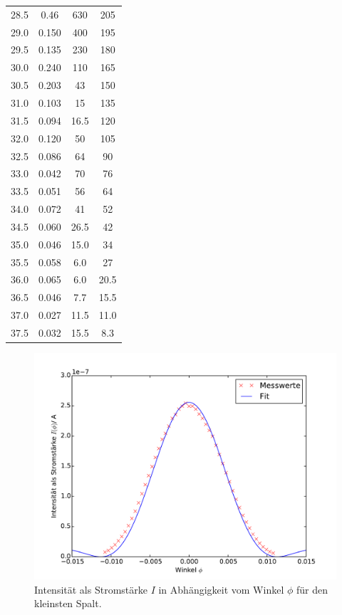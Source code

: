 \begin{table}
\begin{tabular}{c c c c}
28.5 & 0.46 & 630 & 205 \\
29.0 & 0.150 & 400 & 195 \\
29.5 & 0.135 & 230 & 180 \\
30.0 & 0.240 & 110 & 165 \\
30.5 & 0.203 & 43 & 150 \\
31.0 & 0.103 & 15 & 135 \\
31.5 & 0.094 & 16.5 & 120 \\
32.0 & 0.120 & 50 & 105 \\
32.5 & 0.086 & 64 & 90 \\
33.0 & 0.042 & 70 & 76 \\
33.5 & 0.051 & 56 & 64 \\
34.0 & 0.072 & 41 & 52 \\
34.5 & 0.060 & 26.5 & 42 \\
35.0 & 0.046 & 15.0 & 34 \\
35.5 & 0.058 & 6.0 & 27 \\
36.0 & 0.065 & 6.0  & 20.5 \\
36.5 & 0.046 & 7.7  & 15.5 \\
37.0 & 0.027 & 11.5 & 11.0 \\
37.5 & 0.032 & 15.5 & 8.3 \\
\bottomrule
\end{tabular}
\end{table}

\begin{figure}
  \centering
  \includegraphics[scale=0.6]{auswertung/einzel1.pdf}
  \caption{Intensität als Stromstärke $I$ in Abhängigkeit vom Winkel $\phi$ für den kleinsten Spalt.}
  \label{fig:einzel1}
\end{figure}

